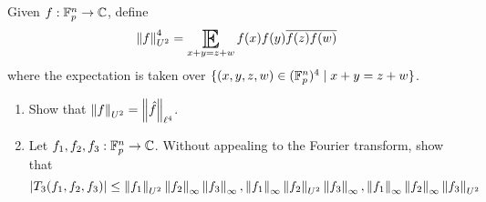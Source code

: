\documentclass{article}
\begin{document}
\begin{problem}
  Given $f : \mathbb F_p^n \to \mathbb C$, define
  $$\norm f_{U^2}^4 = \E_{x + y = z + w}f(x)f(y)\overline{f(z)f(w)}$$
  where the expectation is taken over $\{(x, y, z, w) \in (\mathbb F_p^n)^4 \mid x + y = z + w\}$.
  \begin{enumerate}
    \item Show that $\left\lVert f\right\rVert_{U^2} = \left\lVert \hat f\right\rVert_{\ell^4}$.
    \item Let $f_1, f_2, f_3 : \mathbb F_p^n \to \mathbb C$. Without appealing to the Fourier transform, show that
    $$\left\lvert T_3(f_1, f_2, f_3)\right\rvert \le \left\lVert f_1\right\rVert_{U^2} \left\lVert f_2\right\rVert_\infty \left\lVert f_3\right\rVert_\infty, \left\lVert f_1\right\rVert_\infty \left\lVert f_2\right\rVert_{U^2} \left\lVert f_3\right\rVert_\infty, \left\lVert f_1\right\rVert_\infty \left\lVert f_2\right\rVert_\infty \left\lVert f_3\right\rVert_{U^2}$$
  \end{enumerate}
\end{problem}
\end{document}
